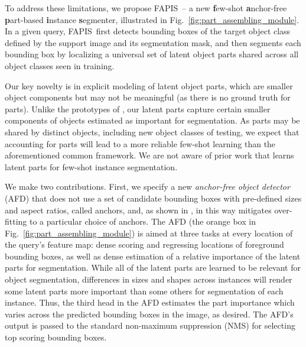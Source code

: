 \documentclass[final]{cvpr}
\def\Approach{FAPIS}
\begin{document}
To address these limitations, we propose \Approach~-- a new {\bf f}ew-shot {\bf a}nchor-free {\bf p}art-based {\bf i}nstance {\bf s}egmenter, illustrated in Fig.~\ref{fig:part_assembling_module}. In a given query, \Approach~first detects bounding boxes of the target object class defined by the support image and its segmentation mask, and then segments each bounding box by localizing a universal set of latent object parts shared across  all object classes seen in training. 

Our key novelty is in explicit modeling of latent object parts, which are smaller object components but may not  be meaningful (as there is no ground truth for parts). Unlike the prototypes of \cite{he2017mask}, our latent parts capture certain smaller components of objects estimated as important for segmentation. As parts may be shared by  distinct objects, including new object classes of testing, we expect that accounting for parts will lead to a more reliable few-shot learning than the aforementioned common framework. We are not aware of prior work that learns latent parts for few-shot instance segmentation.


We make two contributions. First, we specify a new {\em anchor-free object detector } (AFD) that does not use a set of candidate bounding boxes with pre-defined sizes and aspect ratios, called anchors, and, as shown in \cite{tian2019fcos}, in this way mitigates over-fitting to a particular choice of anchors. The AFD  (the orange box in Fig.~\ref{fig:part_assembling_module})  is  aimed at three tasks at every location of the query's  feature map: dense scoring and regressing locations of foreground bounding boxes, as well as dense estimation of a relative importance of the latent parts for segmentation.  While all of the latent parts are learned to be relevant for object segmentation, differences in sizes and shapes across instances will render some latent parts more important than some others for segmentation of each instance. Thus, the third head in the AFD estimates the part importance which varies across the predicted bounding boxes in the image, as desired. The AFD's output is passed to the standard non-maximum suppression (NMS) for selecting top scoring bounding boxes.
\end{document}
